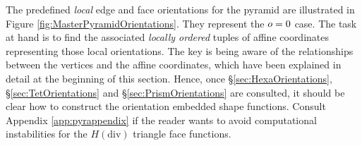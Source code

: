The predefined \textit{local} edge and face orientations for the pyramid are illustrated in Figure \ref{fig:MasterPyramidOrientations}.
They represent the $o=0$ case.
The task at hand is to find the associated \textit{locally ordered} tuples of affine coordinates representing those local orientations.
The key is being aware of the relationships between the vertices and the affine coordinates, which have been explained in detail at the beginning of this section. 
Hence, once \S\ref{sec:HexaOrientations}, \S\ref{sec:TetOrientations} and \S\ref{sec:PrismOrientations} are consulted, it should be clear how to construct the orientation embedded shape functions. 
Consult Appendix \ref{app:pyrappendix} if the reader wants to avoid computational instabilities for the $H(\mathrm{div})$ triangle face functions.

